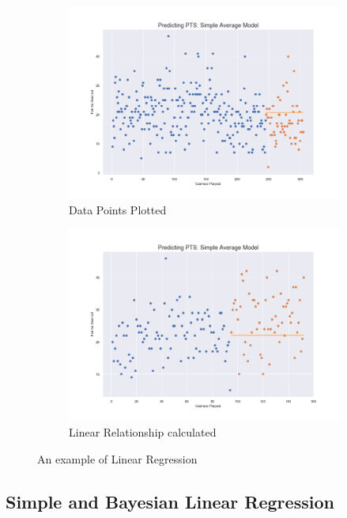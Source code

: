 \documentclass[a4paper,11pt,twoside]{article}
\begin{document}
\begin{figure} [h!]
  \centering
  \begin{subfigure}[b]{0.49\textwidth}
    \includegraphics[width=\textwidth]{../players_sma/player0.png}
    \caption{Data Points Plotted}
    \label{fig:1}
  \end{subfigure}
  \begin{subfigure}[b]{0.49\textwidth}
    \includegraphics[width=\textwidth]{../players_sma/player2.png}
    \caption{Linear Relationship calculated}
    \label{fig:2}
  \end{subfigure}
  \caption{An example of Linear Regression}
  \label{fig:3}
\end{figure}

\subsection{Simple and Bayesian Linear Regression}
\end{document}
